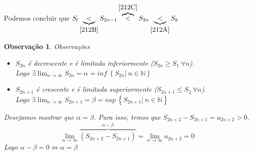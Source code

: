 \documentclass[12pt,openany]{book}
\newtheorem{obs}{Observação}
\begin{document}
Podemos concluir que $S_l \underbrace{<}_{\ref{212B}} S_{2n-1} \overbrace{<}^{\ref{212C}} S_{2n} \underbrace{<}_{\ref{212A}} S_k$

\begin{obs}{Observações}
\begin{itemize}
\item $S_{2n}$ é decrescente e é limitada inferiormente ($S_{2n} \geq S_1 \ \forall n$). \\
Logo $\exists \displaystyle{\lim_{n \rightarrow \infty} S_{2n} = \alpha = inf \ \left\{S_{2n} | \ n \in \mathds{N}\right\} }$
\item $S_{2n+1}$ é crescente e é limitada superiormente ($S_{2n+1} \leq S_2 \ \forall n$). \\
Logo $\exists \displaystyle{\lim_{n \rightarrow \infty} S_{2n+1} = \beta = sup \ \left\{S_{2n+1} | \ n \in \mathds{N}\right\} }$
\end{itemize}

Desejamos mostrar que $\alpha = \beta$. Para isso, temos que $S_{2n+2} - S_{2n+1} = a_{2n+2} > 0$. 
$$\lim_{n \rightarrow \infty} \overbrace{\left(S_{2n+2} - S_{2n+1}\right)}^{\alpha - \beta} = \lim_{n \rightarrow \infty} a_{2n+2} = 0$$
Logo $\alpha - \beta = 0 \Longleftrightarrow \alpha = \beta$
\end{obs}
\newpage
\end{document}
